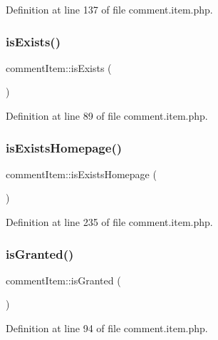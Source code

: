 Definition at line 137 of file comment.\+item.\+php.

\hypertarget{classcommentItem_a994914aab465cd8b950bd05e655afb9f}{}\label{classcommentItem_a994914aab465cd8b950bd05e655afb9f} 
\subsubsection{\texorpdfstring{is\+Exists()}{isExists()}}
{\footnotesize\ttfamily comment\+Item\+::is\+Exists (\begin{DoxyParamCaption}{ }\end{DoxyParamCaption})}



Definition at line 89 of file comment.\+item.\+php.

\hypertarget{classcommentItem_a77da9a1df41b15e776ef22ca2d648aa1}{}\label{classcommentItem_a77da9a1df41b15e776ef22ca2d648aa1} 
\subsubsection{\texorpdfstring{is\+Exists\+Homepage()}{isExistsHomepage()}}
{\footnotesize\ttfamily comment\+Item\+::is\+Exists\+Homepage (\begin{DoxyParamCaption}{ }\end{DoxyParamCaption})}



Definition at line 235 of file comment.\+item.\+php.

\hypertarget{classcommentItem_aa614277cd1369df7b0446e0cffd65c6d}{}\label{classcommentItem_aa614277cd1369df7b0446e0cffd65c6d} 
\subsubsection{\texorpdfstring{is\+Granted()}{isGranted()}}
{\footnotesize\ttfamily comment\+Item\+::is\+Granted (\begin{DoxyParamCaption}{ }\end{DoxyParamCaption})}



Definition at line 94 of file comment.\+item.\+php.

